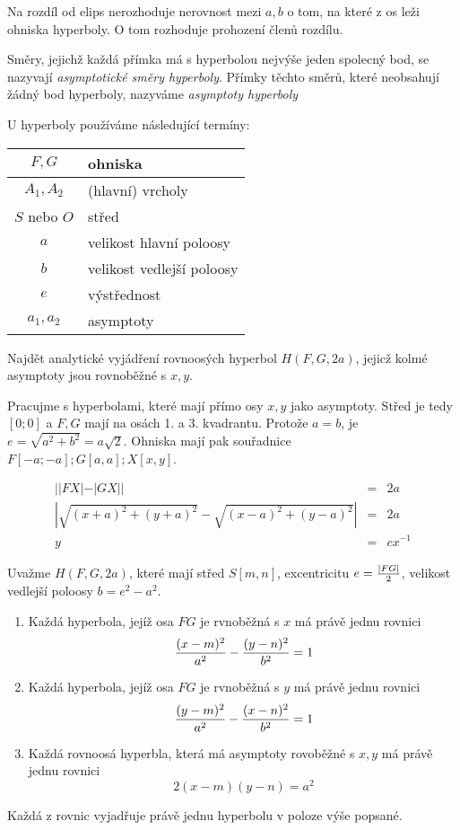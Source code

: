 \Poz
Na rozdíl od elips nerozhoduje nerovnost mezi $a,b$ o tom, na které z os leži ohniska hyperboly.
O tom rozhoduje prohození členů rozdílu.

\Def Směry, jejichž každá přímka má s hyperbolou nejvýše jeden spolecný bod, se nazyvají \emph{asymptotické směry hyperboly}.
Přímky těchto směrů, které neobsahují žádný bod hyperboly, nazyváme \emph{asymptoty hyperboly}

\Def
U hyperboly používáme následující termíny:

\begin{minipage}{0.5\textwidth}
	\begin{tabular}{|c|l|}\hline
		$F,G$ & ohniska \\\hline
		$A_1,A_2$ & (hlavní) vrcholy\\\hline
		$S$ nebo $O$ & střed \\\hline
		$a$ & velikost hlavní poloosy\\\hline
		$b$ & velikost vedlejší poloosy \\\hline
		$e$ & výstřednost \\\hline
		$a_1,a_2$ & asymptoty\\\hline
	\end{tabular}
\end{minipage}
\begin{minipage}{0.5\textwidth}
\end{minipage}

\Pr 
Najdět analytické vyjádření rovnoosých hyperbol $H(F,G,2a)$, jejicž kolmé asymptoty jsou rovnoběžné s $x,y$.

Pracujme s hyperbolami, které mají přímo osy $x,y$  jako asymptoty. Střed je tedy $[0;0]$ a $F,G$ mají na osách 1. a 3. kvadrantu.
Protože $a=b$, je $e = \sqrt{a^2 + b^2} = a\sqrt 2$.
Ohniska mají pak souřadnice $F[-a;-a];G[a,a];X[x,y]$.

\begin{eqnarray*}
	||FX|-|GX|| &=& 2a\\
	|\sqrt{(x+a)^2 + (y+a)^2} - \sqrt{(x-a)^2+(y-a)^2}| &=& 2a\\
	y &=& cx^{-1}
\end{eqnarray*}

\V
Uvažme $H(F,G,2a)$, které mají střed $S[m,n]$, excentricitu $e=\frac{|FG|}{2}$, velikost vedlejší poloosy $b=e^2 - a^2$.
\begin{enumerate}
	\item Každá hyperbola, jejíž osa $FG$ je rvnoběžná s $x$ má právě jednu rovnici
		$$\frac{(x-m)^2}{a^2} - \frac{(y-n)^2}{b^2} = 1$$
	\item Každá hyperbola, jejíž osa $FG$ je rvnoběžná s $y$ má právě jednu rovnici
		$$\frac{(y-m)^2}{a^2} - \frac{(x-n)^2}{b^2} = 1$$
	\item Každá rovnoosá hyperbla, která má asymptoty rovoběžné s $x,y$ má právě jednu rovnici
		$$ 2 (x-m) (y-n) = a^2$$
\end{enumerate}
Každá z rovnic vyjadřuje právě jednu hyperbolu v poloze výše popsané.

